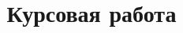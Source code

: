 \documentclass[12pt]{article}
\begin{document}
    \title{Курсовая работа}
    \maketitle

    \clearpage
    
    \tableofcontents

       
\end{document}
